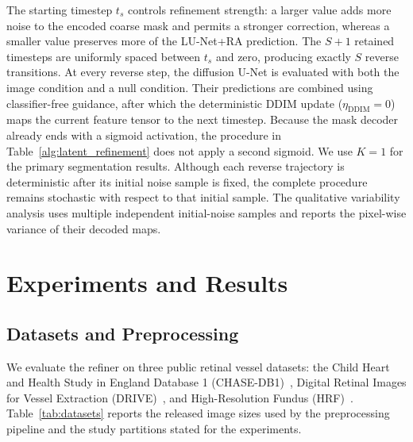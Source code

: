 \documentclass[jimaging,article,submit,pdftex,moreauthors]
  {Definitions/mdpi}
\begin{document}
The starting timestep $t_s$ controls refinement strength: a larger value adds more noise to the encoded coarse mask and permits a stronger correction, whereas a smaller value preserves more of the LU-Net+RA prediction. The $S+1$ retained timesteps are uniformly spaced between $t_s$ and zero, producing exactly $S$ reverse transitions. At every reverse step, the diffusion U-Net is evaluated with both the image condition and a null condition. Their predictions are combined using classifier-free guidance, after which the deterministic DDIM update ($\eta_{\mathrm{DDIM}}=0$) maps the current feature tensor to the next timestep. Because the mask decoder already ends with a sigmoid activation, the procedure in Table~\ref{alg:latent_refinement} does not apply a second sigmoid. We use $K=1$ for the primary segmentation results. Although each reverse trajectory is deterministic after its initial noise sample is fixed, the complete procedure remains stochastic with respect to that initial sample. The qualitative variability analysis uses multiple independent initial-noise samples and reports the pixel-wise variance of their decoded maps.


\section{Experiments and Results}
\label{sec:experiments_results}

\subsection{Datasets and Preprocessing}

We evaluate the refiner on three public retinal vessel datasets: the Child Heart and Health Study in England Database 1 (CHASE-DB1)~\cite{CHASEDB1}, Digital Retinal Images for Vessel Extraction (DRIVE)~\cite{Staal2004}, and High-Resolution Fundus (HRF)~\cite{Odstrcilik2013HRF}. Table~\ref{tab:datasets} reports the released image sizes used by the preprocessing pipeline and the study partitions stated for the experiments.
\end{document}
